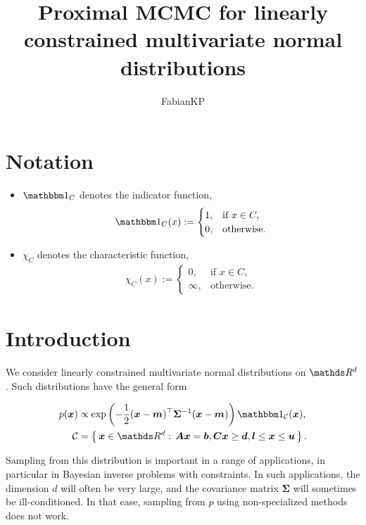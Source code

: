 \documentclass[10pt]{article}
\title{Proximal MCMC for linearly constrained multivariate normal distributions}
\author{FabianKP}
\date{}
\numberwithin{equation}{section}
\begin{document}
\maketitle

\section*{Notation}

\begin{itemize}
\item $\indicator{C}$ denotes the indicator function,
\begin{align*}
\indicator{C}(x) := \begin{cases}
1, & \text{if } x \in C, \\
0, & \text{otherwise}.
\end{cases}
\end{align*}
\item $\chi_{C}$ denotes the characteristic function,
\begin{align*}
\chi_C(x) := \begin{cases}
0, & \text{if } x \in C, \\
\infty, & \text{otherwise}.
\end{cases}
\end{align*}
\end{itemize}


\section{Introduction}

We consider linearly constrained multivariate normal distributions on $\R^d$. Such distributions have the general form

\begin{align*}
p(\bm x) & \propto \exp \left( - \frac{1}{2} (\bm x - \bm m)^\top \bm \Sigma^{-1} (\bm x - \bm m) \right) \indicator{\mathcal C}(\bm x), \\
\mathcal C &= \Set{\bm x \in \R^d}{\bm A \bm x = \bm b, \bm C \bm x \geq \bm d, \bm l \leq \bm x \leq \bm u}.
\end{align*}

Sampling from this distribution is important in a range of applications, in particular in Bayesian inverse problems with constraints. In such applications, the dimension $d$ will often be very large, and the covariance matrix $\bm \Sigma$ will sometimes be ill-conditioned. In that case, sampling from $p$ using non-specialized methods does not work.
\end{document}
